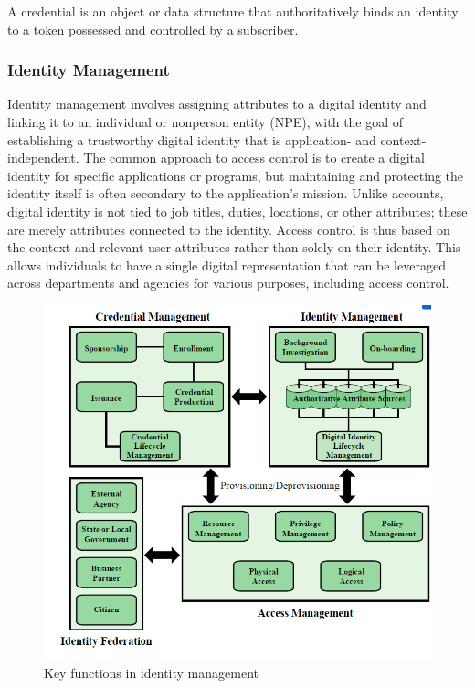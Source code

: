 \documentclass{article}
\begin{document}
                                    A credential is an object or data structure that authoritatively binds an identity to a token possessed and controlled by a subscriber.

                                    \subsubsection {Identity Management}
                                    Identity management involves assigning attributes to a digital identity and linking it to an individual or nonperson entity (NPE), with the goal of establishing a trustworthy digital identity that is application- and context-independent. The common approach to access control is to create a digital identity for specific applications or programs, but maintaining and protecting the identity itself is often secondary to the application's mission. Unlike accounts, digital identity is not tied to job titles, duties, locations, or other attributes; these are merely attributes connected to the identity. Access control is thus based on the context and relevant user attributes rather than solely on their identity. This allows individuals to have a single digital representation that can be leveraged across departments and agencies for various purposes, including access control.

                                    \begin{figure}[h]
                                        \centering
                                        \includegraphics[scale=0.5]{../immagini/keyfunction.png}
                                        \caption{Key functions in
                                        identity
                                        management}
                                    \end{figure}
\end{document}

